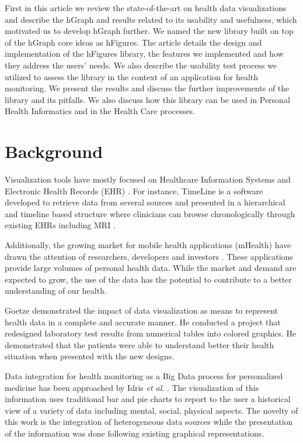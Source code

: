 \documentclass[twocolumn]{bmcart}%
\begin{document}
First in this article we review the state-of-the-art on health data visualizations and describe the hGraph and results related to its usability and usefulness, which motivated us to develop hGraph further. We named the new library built on top of the hGraph core ideas as hFigures. The article details the design and implementation of the hFigures library, the features we implemented and how they address the users' needs. We also describe the usability test process we utilized to assess the library in the context of an application for health monitoring. We present the results and discuss the further improvements of the library and its pitfalls. We also discuss how this library can be used in Personal Health Informatics and in the Health Care processes.

\section*{Background}



Visualization tools have mostly focused on Healthcare Information Systems and Electronic Health Records (EHR) \cite{lesselroth2011data}. For instance, TimeLine is a software developed to retrieve data from several sources and presented in a hierarchical and timeline based structure where clinicians can browse chronologically through existing EHRs including MRI \cite{bui2007information}.

Additionally, the growing market for mobile health applications (mHealth) have drawn the attention of researchers, developers and investors \cite{mHealth2014}. These applications provide large volumes of personal health data. While the market and demand are expected to grow, the use of the data has the potential to contribute to a better understanding of our health.

Goetze \cite{goetz2015} demonstrated the impact of data visualization as means to represent health data in a complete and accurate manner. He conducted a project that redesigned laboratory test results from numerical tables into colored graphics. He demonstrated that the patients were able to understand better their health situation when presented with the new designs.

Data integration for health monitoring as a Big Data process for personalized medicine has been approached by Idris \textit{et al}. \cite{7072838}. The visualization of this information uses traditional bar and pie charts to report to the user a historical view of a variety of data including mental, social, physical aspects. The novelty of this work is the integration of heterogeneous data sources while the presentation of the information was done following existing graphical representations.
\end{document}
